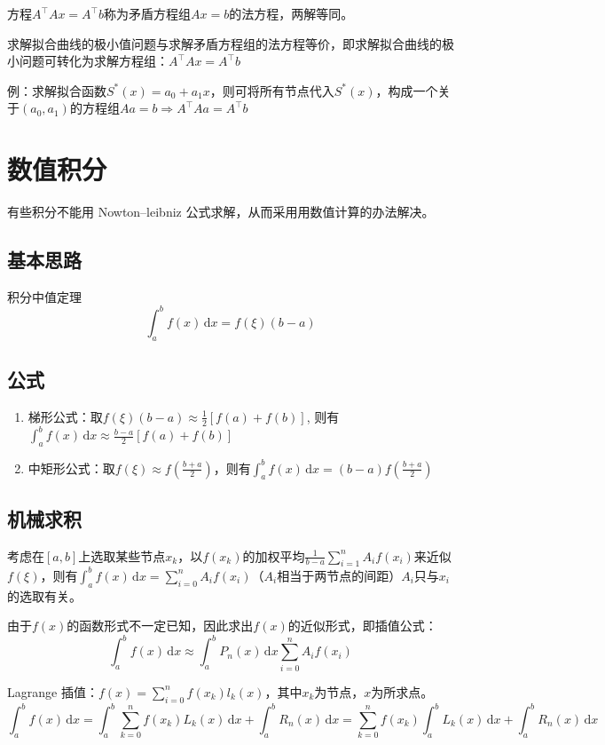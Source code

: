 \documentclass[UTF8,a4paper,11pt,oneside]{ctexbook}
\begin{document}
方程\(A^\top Ax=A^\top b\)称为矛盾方程组\(Ax=b\)的法方程，两解等同。

求解拟合曲线的极小值问题与求解矛盾方程组的法方程等价，即求解拟合曲线的极小问题可转化为求解方程组：\(A^\top Ax=A^\top b\)

例：求解拟合函数\(S^*(x)=a_0+a_1x\)，则可将所有节点代入\(S^*(x)\)，构成一个关于\((a_0,a_1)\)的方程组\(Aa=b\Rightarrow A^\top Aa=A^\top b\)

\chapter{数值积分}

有些积分不能用 Nowton--leibniz 公式求解，从而采用用数值计算的办法解决。

\section{基本思路}

积分中值定理
\[
\int_a^bf(x)\,\mathrm{d}x=f(\xi)(b-a)
\]

\section{公式}
\begin{enumerate}
    \item 梯形公式：取\(f(\xi)(b-a)\approx\frac{1}{2}[f(a)+f(b)]\), 则有\(\int_a^bf(x)\,\mathrm{d}x\approx\frac{b-a}{2}[f(a)+f(b)]\)
    \item 中矩形公式：取\(f(\xi)\approx f\left(\frac{b+a}{2}\right)\)，则有\(\int_a^bf(x)\,\mathrm{d}x=(b-a)f\left(\frac{b+a}{2}\right)\)
\end{enumerate}

\section{机械求积}

考虑在\([a,b]\)上选取某些节点\(x_k\)，以\(f(x_k)\)的加权平均\(\frac{1}{b-a}\sum\limits_{i=1}^nA_if(x_i)\)来近似\(f(\xi)\)，则有\(\int_a^bf(x)\,\mathrm{d}x=\sum\limits_{i=0}^nA_if(x_i)\)（\(A_i\)相当于两节点的间距）\(A_i\)只与\(x_i\)的选取有关。

由于\(f(x)\)的函数形式不一定已知，因此求出\(f(x)\)的近似形式，即插值公式：
\[
\int_a^bf(x)\,\mathrm{d}x\approx\int_a^bP_n(x)\,\mathrm{d}x\sum_{i=0}^nA_if(x_i)
\]

Lagrange 插值：\(f(x)=\sum\limits_{i=0}^nf(x_k)l_k(x)\)，其中\(x_k\)为节点，\(x\)为所求点。
\[
\int_a^bf(x)\,\mathrm{d}x=\int_a^b\sum_{k=0}^nf(x_k)L_k(x)\,\mathrm{d}x+\int_a^bR_n(x)\,\mathrm{d}x=\sum_{k=0}^nf(x_k)\int_a^bL_k(x)\,\mathrm{d}x+\int_a^bR_n(x)\,\mathrm{d}x
\]
\end{document}
